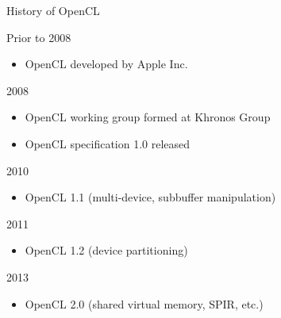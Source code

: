 


\begin{frame}{History of OpenCL}

\begin{minipage}{0.7\textwidth}
\begin{block}{Prior to 2008}
  \begin{itemize}
   \item OpenCL developed by Apple Inc.
  \end{itemize}
\end{block}

\begin{block}{2008}
  \begin{itemize}
   \item OpenCL working group formed at Khronos Group
   \item OpenCL specification 1.0 released
  \end{itemize}
\end{block}

\begin{block}{2010}
  \begin{itemize}
   \item OpenCL 1.1 (multi-device, subbuffer manipulation)
  \end{itemize}
\end{block}

\begin{block}{2011}
  \begin{itemize}
   \item OpenCL 1.2 (device partitioning)
  \end{itemize}
\end{block}

\begin{block}{2013}
  \begin{itemize}
   \item OpenCL 2.0 (shared virtual memory, SPIR, etc.)
  \end{itemize}
\end{block}


\end{minipage}
\end{frame}
